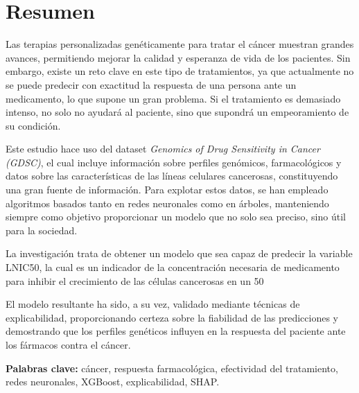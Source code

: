 \chapter*{Resumen}

Las terapias personalizadas genéticamente para tratar el cáncer muestran grandes avances, permitiendo mejorar la calidad y esperanza de vida de los pacientes. Sin embargo, existe un reto clave en este tipo de tratamientos, ya que actualmente no se puede predecir con exactitud la respuesta de una persona ante un medicamento, lo que supone un gran problema. Si el tratamiento es demasiado intenso, no solo no ayudará al paciente, sino que supondrá un empeoramiento de su condición.

Este estudio hace uso del dataset \textit{Genomics of Drug Sensitivity in Cancer (GDSC)}, el cual incluye información sobre perfiles genómicos, farmacológicos y datos sobre las características de las líneas celulares cancerosas, constituyendo una gran fuente de información. Para explotar estos datos, se han empleado algoritmos basados tanto en redes neuronales como en árboles, manteniendo siempre como objetivo proporcionar un modelo que no solo sea preciso, sino útil para la sociedad.

La investigación trata de obtener un modelo que sea capaz de predecir la variable LNIC50, la cual es un indicador de la concentración necesaria de medicamento para inhibir el crecimiento de las células cancerosas en un 50%

El modelo resultante ha sido, a su vez, validado mediante técnicas de explicabilidad, proporcionando certeza sobre la fiabilidad de las predicciones y demostrando que los perfiles genéticos influyen en la respuesta del paciente ante los fármacos contra el cáncer.

\vspace{.5cm}

\textbf{Palabras clave:} cáncer, respuesta farmacológica, efectividad del tratamiento, redes neuronales, XGBoost, explicabilidad, SHAP.